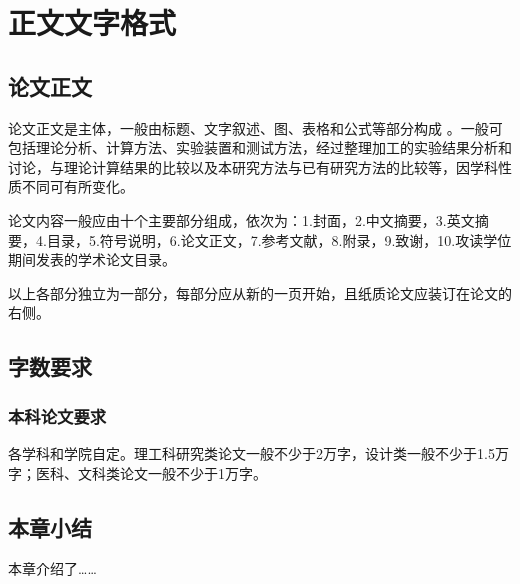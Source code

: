 
\chapter{正文文字格式}

\section{论文正文}
论文正文是主体，一般由标题、文字叙述、图、表格和公式等部分构成 \cite{Yang1999}。一般可包括理论分析、计算方法、实验装置和测试方法，经过整理加工的实验结果分析和讨论，与理论计算结果的比较以及本研究方法与已有研究方法的比较等，因学科性质不同可有所变化。
\par 论文内容一般应由十个主要部分组成，依次为：1.封面，2.中文摘要，3.英文摘要，4.目录，5.符号说明，6.论文正文，7.参考文献，8.附录，9.致谢，10.攻读学位期间发表的学术论文目录\cite{Yu2012}。
\par 以上各部分独立为一部分，每部分应从新的一页开始，且纸质论文应装订在论文的右侧。


\section{字数要求}
\subsection{本科论文要求}
各学科和学院自定。理工科研究类论文一般不少于2万字，设计类一般不少于1.5万字；医科、文科类论文一般不少于1万字。

\section{本章小结}
本章介绍了……

